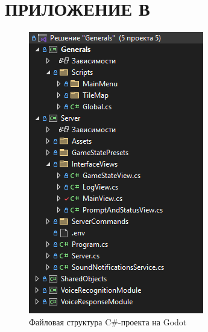 \section*{ПРИЛОЖЕНИЕ В}
\begin{figure}[H]
    \centering
    \caption{Файловая структура C\#-проекта на Godot}\label{app1}
    \includegraphics[height=0.75\textheight]{pictures/godot_fs.png}
\end{figure}
\pagebreak

